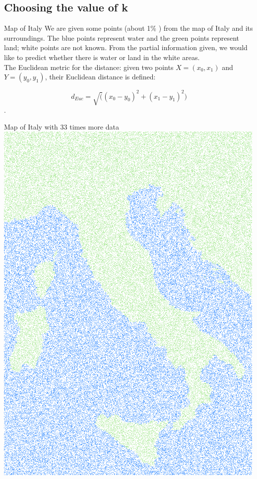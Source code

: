 \documentclass{beamer}
\begin{document}
\subsection{Choosing the value of k}

\begin{frame}{Map of Italy}\vspace{10pt}
We are given some points (about 1\% ) from the map of Italy and its
surroundings. The blue points represent water and the green points represent land; white
points are not known. From the partial information given, we would like to predict whether
there is water or land in the white areas.  \\

The Euclidean metric for the distance:
given two points $X=(x_0,x_1)$  and $Y=(y_0,y_1)$, their Euclidean distance is defined:

    $$d_{Euc} = \sqrt((x_0-y_0)^2+(x_1-y_1)^2)$$.\\

\end{frame}

\begin{frame}{Map of Italy with 33 times more data}
    \includegraphics[scale=0.5]{italy1.png}
    \centering
\end{frame}
\end{document}
